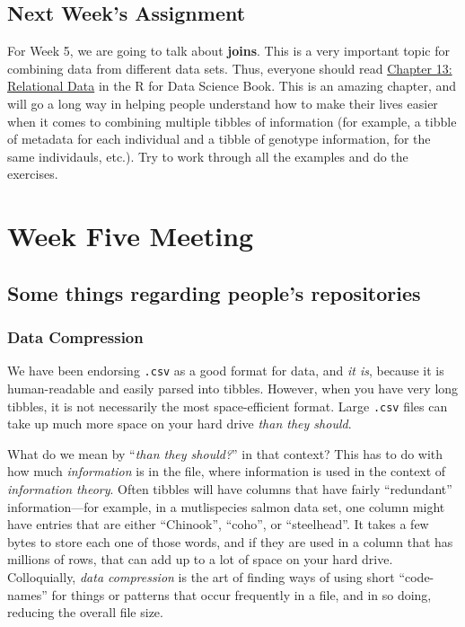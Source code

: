 \documentclass[]{book}
\theoremstyle{definition}
\theoremstyle{definition}
\theoremstyle{remark}
\begin{document}
\section{Next Week's Assignment}\label{next-weeks-assignment-1}

For Week 5, we are going to talk about \textbf{joins}. This is a very
important topic for combining data from different data sets. Thus,
everyone should read
\href{http://r4ds.had.co.nz/relational-data.html}{Chapter 13: Relational
Data} in the R for Data Science Book. This is an amazing chapter, and
will go a long way in helping people understand how to make their lives
easier when it comes to combining multiple tibbles of information (for
example, a tibble of metadata for each individual and a tibble of
genotype information, for the same individauls, etc.). Try to work
through all the examples and do the exercises.

\chapter{Week Five Meeting}\label{week5}

\section{Some things regarding people's
repositories}\label{some-things-regarding-peoples-repositories}

\subsection{Data Compression}\label{data-compression}

We have been endorsing \texttt{.csv} as a good format for data, and
\emph{it is}, because it is human-readable and easily parsed into
tibbles. However, when you have very long tibbles, it is not necessarily
the most space-efficient format. Large \texttt{.csv} files can take up
much more space on your hard drive \emph{than they should}.

What do we mean by ``\emph{than they should?}'' in that context? This
has to do with how much \emph{information} is in the file, where
information is used in the context of \emph{information theory}. Often
tibbles will have columns that have fairly ``redundant''
information---for example, in a mutlispecies salmon data set, one column
might have entries that are either ``Chinook'', ``coho'', or
``steelhead''. It takes a few bytes to store each one of those words,
and if they are used in a column that has millions of rows, that can add
up to a lot of space on your hard drive. Colloquially, \emph{data
compression} is the art of finding ways of using short ``code-names''
for things or patterns that occur frequently in a file, and in so doing,
reducing the overall file size.
\end{document}
